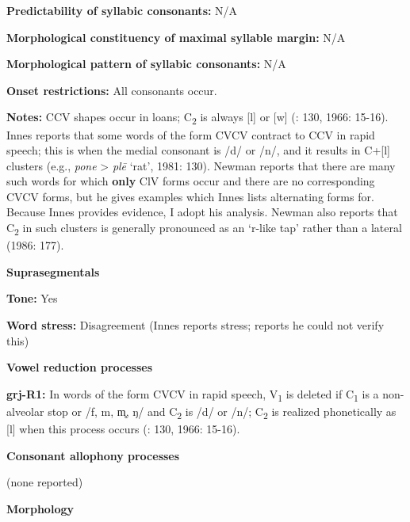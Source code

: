 \textbf{Predictability of syllabic consonants:} N/A



\textbf{Morphological constituency of maximal syllable margin:} N/A



\textbf{Morphological pattern of syllabic consonants:} N/A



\textbf{Onset restrictions:} All consonants occur.



\textbf{Notes:} CCV shapes occur in loans; C\textsubscript{2} is always [l] or [w] (\citealt{Innes1981}: 130, 1966: 15-16). Innes reports that some words of the form CVCV contract to CCV in rapid speech; this is when the medial consonant is /d/ or /n/, and it results in C+[l] clusters (e.g., \textit{pone} > \textit{plē} ‘rat’, 1981: 130). Newman reports that there are many such words for which \textbf{only} ClV forms occur and there are no corresponding CVCV forms, but he gives examples which Innes lists alternating forms for. Because Innes provides evidence, I adopt his analysis. Newman also reports that C\textsubscript{2} in such clusters is generally pronounced as an ‘r-like tap’ rather than a lateral (1986: 177).



\textbf{Suprasegmentals}



\textbf{Tone:} Yes



\textbf{Word stress:} Disagreement (Innes reports stress; \citealt{Newman1986} reports he could not verify this)



\textbf{Vowel reduction processes}



\textbf{grj-R1:} In words of the form CVCV in rapid speech, V\textsubscript{1} is deleted if C\textsubscript{1} is a non-alveolar stop or /f, m, m̥, ŋ/ and C\textsubscript{2} is /d/ or /n/; C\textsubscript{2} is realized phonetically as [l] when this process occurs (\citealt{Innes1981}: 130, 1966: 15-16).



\textbf{Consonant allophony processes}



(none reported)



\textbf{Morphology}



